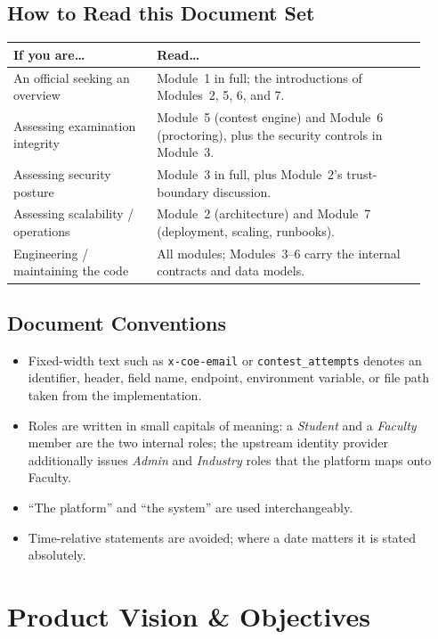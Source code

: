 \documentclass[12pt,a4paper,oneside]{report}
\newcommand{\code}[1]{\texttt{#1}}
\begin{document}
\section{How to Read this Document Set}
\begin{longtable}{@{}p{0.32\linewidth} p{0.60\linewidth}@{}}
\toprule
\textbf{If you are\ldots} & \textbf{Read\ldots}\\
\midrule
\endhead
An official seeking an overview & Module~1 in full; the introductions of Modules~2, 5, 6, and 7.\\
Assessing examination integrity & Module~5 (contest engine) and Module~6 (proctoring), plus the security controls in Module~3.\\
Assessing security posture & Module~3 in full, plus Module~2's trust-boundary discussion.\\
Assessing scalability / operations & Module~2 (architecture) and Module~7 (deployment, scaling, runbooks).\\
Engineering / maintaining the code & All modules; Modules~3--6 carry the internal contracts and data models.\\
\bottomrule
\end{longtable}

\section{Document Conventions}
\begin{itemize}[leftmargin=1.5em]
  \item Fixed-width text such as \code{x-coe-email} or \code{contest\_attempts}
        denotes an identifier, header, field name, endpoint, environment
        variable, or file path taken from the implementation.
  \item Roles are written in small capitals of meaning: a \emph{Student} and a
        \emph{Faculty} member are the two internal roles; the upstream identity
        provider additionally issues \emph{Admin} and \emph{Industry} roles that
        the platform maps onto Faculty.
  \item ``The platform'' and ``the system'' are used
        interchangeably.
  \item Time-relative statements are avoided; where a date matters it is stated
        absolutely.
\end{itemize}

\chapter{Product Vision \& Objectives}
\end{document}
